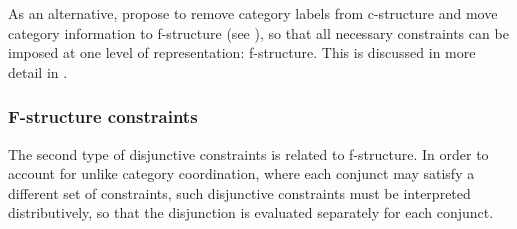 \documentclass[output=paper]{../langscibook}
\begin{document}
As an alternative, \citet{PP2021} propose to remove category
labels from c-structure and move category information to f-structure
(see ), so that all necessary constraints can
be imposed at one level of representation: f-structure. This is discussed in more
detail in .

\subsubsection{F-structure constraints}
\label{sec:Coordination:unlikes:disj:prop}

The second type of disjunctive constraints is related to
f-structure. In order to account for unlike category coordination,
where each conjunct may satisfy a different set of constraints, such
disjunctive constraints must be interpreted distributively, so that the disjunction
is evaluated separately for each conjunct.
\end{document}
